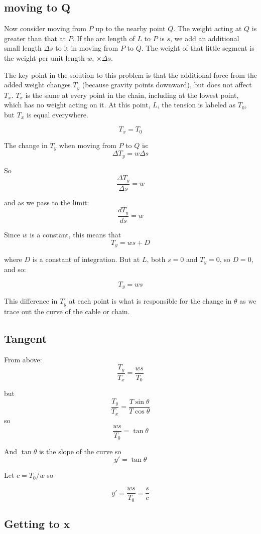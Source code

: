 \documentclass[11pt, oneside]{article}
\begin{document}
\subsection*{moving to Q}

Now consider moving from $P$ up to the nearby point $Q$.  The weight acting at $Q$ is greater than that at $P$.  If the arc length of $L$ to $P$ is $s$, we add an additional small length $\Delta s$ to it in moving from $P$ to $Q$.  The weight of that little segment is the weight per unit length $w$, $\times \Delta s$.

The key point in the solution to this problem is that the additional force from the added weight changes $T_y$ (because gravity points downward), but does not affect $T_x$.  $T_x$ is the same at every point in the chain, including at the lowest point, which has no weight acting on it.  At this point, $L$, the tension is labeled as $T_0$, but $T_x$ is equal everywhere.

\[ T_x = T_0 \]

The change in $T_y$ when moving from $P$ to $Q$ is:
\[  \Delta T_y = w \Delta s \]
    
So
\[ \frac{\Delta T_y}{\Delta s} = w \]

and as we pass to the limit: 
\[ \frac{d T_y}{ds} = w \]

Since $w$ is a constant, this means that
\[ T_y = ws + D \]

where $D$ is a constant of integration.  But at $L$, both $s = 0$ and $T_y = 0$, so $D = 0$, and so:

\[ T_y = ws \]

This difference in $T_y$ at each point is what is responsible for the change in $\theta$ as we trace out the curve of the cable or chain.

\subsection*{Tangent}

From above:
\[ \frac{T_y}{T_x} = \frac{ws}{T_0} \]
    
but 
\[  \frac{T_y}{T_x} = \frac{T \sin \theta}{T \cos \theta} \]
so
\[  \frac{ws}{T_0} = \tan \theta \]

And $\tan \theta$ is the slope of the curve so
\[ y' = \tan \theta \]

Let $c = T_0/w$ so

\[  y' = \frac{ws}{T_0} = \frac{s}{c}  \]

\subsection*{Getting to x}
\end{document}
